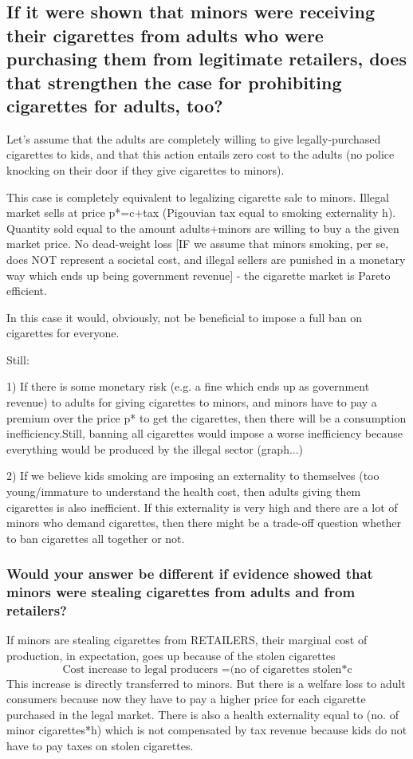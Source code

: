 \documentclass{article}
\begin{document}
\subsection{If it were shown that minors were receiving their
  cigarettes from adults who were purchasing them from legitimate
  retailers, does that strengthen the case for prohibiting cigarettes
  for adults, too?}

Let's assume that the adults are completely willing to give
legally-purchased cigarettes to kids, and that this action entails zero cost
to the adults (no police knocking on their door if they give cigarettes
to minors).

This case is completely equivalent to legalizing cigarette sale to
minors. Illegal market sells at price p*=c+tax (Pigouvian tax equal
to smoking externality h). Quantity sold equal to
the amount adults+minors are willing to buy a the given market
price. No dead-weight  loss [IF we assume that minors smoking, per se,
does NOT represent a societal cost, and illegal sellers are punished
in a monetary way which ends up being government revenue] - the
cigarette market is Pareto efficient.

In this case it would, obviously, not be beneficial to impose a full
ban on cigarettes for everyone.

Still:

1) If there is some monetary risk (e.g. a fine which ends up as
government revenue) to adults for giving cigarettes to minors, and
minors have to pay a premium over the price p* to get the cigarettes,
then there will be a consumption inefficiency.Still, banning all
cigarettes would impose a worse inefficiency because everything would
be produced by the illegal sector (graph...)

2) If we believe kids smoking are imposing an externality to
themselves (too young/immature to understand the health cost, then
adults giving them cigarettes is also inefficient. If this externality
is very high and there are a lot of minors who demand cigarettes, then
there might be a trade-off question whether to ban cigarettes
all together or not.


\subsubsection{Would your answer be different if evidence showed that
  minors were stealing cigarettes from adults and from retailers?}

If minors are stealing cigarettes from RETAILERS, their marginal cost
of production, in expectation, goes up because of the stolen
cigarettes $$\text{Cost increase to legal producers =(no of cigarettes
  stolen*c}$$ This increase is directly transferred to minors. But there is a welfare
loss to adult consumers because now they have to pay a higher price
for each cigarette purchased in the legal market. There is also a
health externality equal to (no. of minor cigarettes*h) which is not
compensated by tax revenue because kids do not have to pay taxes on
stolen cigarettes.
\end{document}
